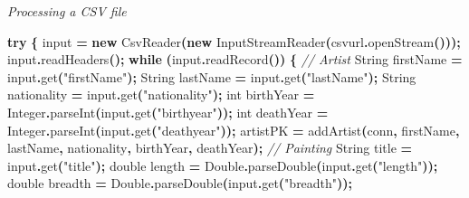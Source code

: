 \documentclass[
]{article}
\newenvironment{Shaded}{\begin{snugshade}}{\end{snugshade}}
\newcommand{\BuiltInTok}[1]{#1}
\newcommand{\CommentTok}[1]{\textcolor[rgb]{0.56,0.35,0.01}{\textit{#1}}}
\newcommand{\ControlFlowTok}[1]{\textcolor[rgb]{0.13,0.29,0.53}{\textbf{#1}}}
\newcommand{\DataTypeTok}[1]{\textcolor[rgb]{0.13,0.29,0.53}{#1}}
\newcommand{\FunctionTok}[1]{\textcolor[rgb]{0.00,0.00,0.00}{#1}}
\newcommand{\KeywordTok}[1]{\textcolor[rgb]{0.13,0.29,0.53}{\textbf{#1}}}
\newcommand{\NormalTok}[1]{#1}
\newcommand{\OperatorTok}[1]{\textcolor[rgb]{0.81,0.36,0.00}{\textbf{#1}}}
\newcommand{\StringTok}[1]{\textcolor[rgb]{0.31,0.60,0.02}{#1}}
\begin{document}
\emph{Processing a CSV file}

\begin{Shaded}
\begin{Highlighting}[]
\ControlFlowTok{try} \OperatorTok{\{}
\NormalTok{    input }\OperatorTok{=} \KeywordTok{new} \FunctionTok{CsvReader}\OperatorTok{(}\KeywordTok{new} \BuiltInTok{InputStreamReader}\OperatorTok{(}\NormalTok{csvurl}\OperatorTok{.}\FunctionTok{openStream}\OperatorTok{()));}
\NormalTok{    input}\OperatorTok{.}\FunctionTok{readHeaders}\OperatorTok{();}
    \ControlFlowTok{while} \OperatorTok{(}\NormalTok{input}\OperatorTok{.}\FunctionTok{readRecord}\OperatorTok{())}
    \OperatorTok{\{}
    \CommentTok{// Artist}
        \BuiltInTok{String}\NormalTok{ firstName }\OperatorTok{=}\NormalTok{ input}\OperatorTok{.}\FunctionTok{get}\OperatorTok{(}\StringTok{"firstName"}\OperatorTok{);}
        \BuiltInTok{String}\NormalTok{ lastName }\OperatorTok{=}\NormalTok{ input}\OperatorTok{.}\FunctionTok{get}\OperatorTok{(}\StringTok{"lastName"}\OperatorTok{);}
        \BuiltInTok{String}\NormalTok{ nationality }\OperatorTok{=}\NormalTok{ input}\OperatorTok{.}\FunctionTok{get}\OperatorTok{(}\StringTok{"nationality"}\OperatorTok{);}
        \DataTypeTok{int}\NormalTok{ birthYear }\OperatorTok{=} \BuiltInTok{Integer}\OperatorTok{.}\FunctionTok{parseInt}\OperatorTok{(}\NormalTok{input}\OperatorTok{.}\FunctionTok{get}\OperatorTok{(}\StringTok{"birthyear"}\OperatorTok{));}
        \DataTypeTok{int}\NormalTok{ deathYear }\OperatorTok{=} \BuiltInTok{Integer}\OperatorTok{.}\FunctionTok{parseInt}\OperatorTok{(}\NormalTok{input}\OperatorTok{.}\FunctionTok{get}\OperatorTok{(}\StringTok{"deathyear"}\OperatorTok{));}
\NormalTok{        artistPK }\OperatorTok{=} \FunctionTok{addArtist}\OperatorTok{(}\NormalTok{conn}\OperatorTok{,}\NormalTok{ firstName}\OperatorTok{,}\NormalTok{ lastName}\OperatorTok{,}\NormalTok{ nationality}\OperatorTok{,}\NormalTok{ birthYear}\OperatorTok{,}\NormalTok{ deathYear}\OperatorTok{);}
        \CommentTok{// Painting}
        \BuiltInTok{String}\NormalTok{ title }\OperatorTok{=}\NormalTok{ input}\OperatorTok{.}\FunctionTok{get}\OperatorTok{(}\StringTok{"title"}\OperatorTok{);}
        \DataTypeTok{double}\NormalTok{ length }\OperatorTok{=} \BuiltInTok{Double}\OperatorTok{.}\FunctionTok{parseDouble}\OperatorTok{(}\NormalTok{input}\OperatorTok{.}\FunctionTok{get}\OperatorTok{(}\StringTok{"length"}\OperatorTok{));}
        \DataTypeTok{double}\NormalTok{ breadth }\OperatorTok{=} \BuiltInTok{Double}\OperatorTok{.}\FunctionTok{parseDouble}\OperatorTok{(}\NormalTok{input}\OperatorTok{.}\FunctionTok{get}\OperatorTok{(}\StringTok{"breadth"}\OperatorTok{));}

\end{Highlighting}
\end{Shaded}
\end{document}
